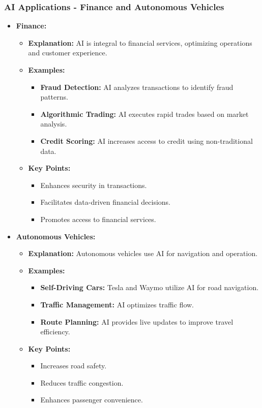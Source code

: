 \documentclass[aspectratio=169]{beamer}
\begin{document}
\begin{frame}[fragile]
    \frametitle{AI Applications - Finance and Autonomous Vehicles}
    \begin{itemize}
        \item \textbf{Finance:}
        \begin{itemize}
            \item \textbf{Explanation:} AI is integral to financial services, optimizing operations and customer experience.
            \item \textbf{Examples:}
            \begin{itemize}
                \item \textbf{Fraud Detection:} AI analyzes transactions to identify fraud patterns.
                \item \textbf{Algorithmic Trading:} AI executes rapid trades based on market analysis.
                \item \textbf{Credit Scoring:} AI increases access to credit using non-traditional data.
            \end{itemize}
            \item \textbf{Key Points:}
            \begin{itemize}
                \item Enhances security in transactions.
                \item Facilitates data-driven financial decisions.
                \item Promotes access to financial services.
            \end{itemize}
        \end{itemize}

        \item \textbf{Autonomous Vehicles:}
        \begin{itemize}
            \item \textbf{Explanation:} Autonomous vehicles use AI for navigation and operation.
            \item \textbf{Examples:}
            \begin{itemize}
                \item \textbf{Self-Driving Cars:} Tesla and Waymo utilize AI for road navigation.
                \item \textbf{Traffic Management:} AI optimizes traffic flow.
                \item \textbf{Route Planning:} AI provides live updates to improve travel efficiency.
            \end{itemize}
            \item \textbf{Key Points:}
            \begin{itemize}
                \item Increases road safety.
                \item Reduces traffic congestion.
                \item Enhances passenger convenience.
            \end{itemize}
        \end{itemize}
    \end{itemize}
\end{frame}
\end{document}
